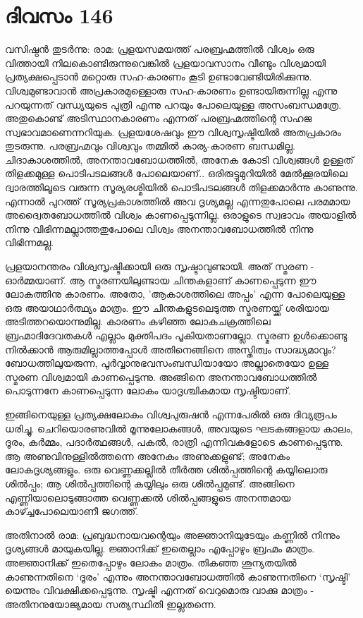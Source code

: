 \section{ദിവസം 146}


വസിഷ്ഠൻ തുടർന്നു: രാമ: പ്രളയസമയത്ത് പരബ്രഹ്മത്തിൽ വിശ്വം ഒരു വിത്തായി നിലകൊണ്ടിരുന്നുവെങ്കിൽ പ്രളയാവസാനം വീണ്ടും വിശ്വമായി പ്രത്യക്ഷപ്പെടാൻ മറ്റൊരു സഹ-കാരണം കൂടി ഉണ്ടാവേണ്ടിയിരിക്കുന്നു. വിശ്വമുണ്ടാവാൻ അപ്രകാരമുള്ളൊരു സഹ-കാരണം ഉണ്ടായിരുന്നില്ല എന്നു പറയുന്നത് വന്ധ്യയുടെ പുത്രി എന്നു പറയും പോലെയുള്ള അസംബന്ധമത്രേ. അതുകൊണ്ട് അടിസ്ഥാനകാരണം എന്നത് പരബ്രഹ്മത്തിന്റെ സഹജ സ്വഭാവമാണെന്നറിയുക. പ്രളയശേഷവും ഈ വിശ്വസൃഷ്ടിയില്‍ അതപ്രകാരം തുടരുന്നു. പരബ്രഹ്മവും വിശ്വവും തമ്മിൽ കാര്യ-കാരണ ബന്ധമില്ല. ചിദാകാശത്തിൽ, അനന്താവബോധത്തിൽ, അനേക കോടി വിശ്വങ്ങൾ ഉള്ളത് തിളക്കമുള്ള പൊടിപടലങ്ങൾ പോലെയാണ്‌.. ഒരിരുട്ടുമുറിയില്‍  മേൽക്കൂരയിലെ ദ്വാരത്തിലൂടെ വരുന്ന സൂര്യരശ്മിയിൽ പൊടിപടലങ്ങൾ തിളക്കമാർന്നു കാണുന്നു. എന്നാൽ പുറത്ത് സൂര്യപ്രകാശത്തിൽ അവ ദൃശ്യമല്ല എന്നതുപോലെ പരമമായ അദ്വൈതബോധത്തിൽ വിശ്വം കാണപ്പെടുന്നില്ല. ഒരാളുടെ സ്വഭാവം അയാളിൽ നിന്നു വിഭിന്നമല്ലാത്തതുപോലെ വിശ്വം അനന്താവബോധത്തിൽ നിന്നു വിഭിന്നമല്ല.

പ്രളയാനന്തരം വിശ്വസൃഷ്ടിക്കായി ഒരു സൃഷ്ടാവുണ്ടായി. അത് സ്മരണ - ഓർമ്മയാണ്‌. ആ സ്മരണയിലുണ്ടായ ചിന്തകളാണ്‌ കാണപ്പെടുന്ന ഈ ലോകത്തിനു കാരണം. അതോ, 'ആകാശത്തിലെ അപ്പം' എന്ന പോലെയുള്ള ഒരു അയാഥാർത്ഥ്യം മാത്രം.  ഈ ചിന്തകളുടലെടുത്ത സ്മരണയ്ക്ക് ശരിയായ അടിത്തറയൊന്നുമില്ല. കാരണം കഴിഞ്ഞ ലോകചക്രത്തിലെ ബ്രഹ്മാദിദേവതകൾ എല്ലാം മുക്തിപദം പൂകിയതാണല്ലോ. സ്മരണ ഉൾക്കൊണ്ടു നിൽക്കാൻ ആരുമില്ലാത്തപ്പോൾ അതിനെങ്ങിനെ അസ്തിത്വം സാദ്ധ്യമാവും? ബോധത്തിലുയരുന്ന, പൂർവ്വാനുഭവസംബന്ധിയായോ അല്ലാതെയോ ഉള്ള സ്മരണ വിശ്വമായി കാണപ്പെടുന്നു. അങ്ങിനെ അനന്താവബോധത്തിൽ പൊടുന്നനേ കാണപ്പെടുന്ന ലോകം യാദൃശ്ചികമായ സൃഷ്ടിയാണ്‌.

ഇങ്ങിനെയുള്ള പ്രത്യക്ഷലോകം വിശ്വപുരുഷൻ എന്നപേരിൽ ഒരു ദിവ്യരൂപം ധരിച്ചു. ചെറിയൊരണുവിൽ മൂന്നുലോകങ്ങള്‍, അവയുടെ ഘടകങ്ങളായ കാലം, ദൂരം, കർമ്മം, പദാർത്ഥങ്ങൾ, പകൽ, രാത്രി എന്നിവകളോടെ കാണപ്പെടുന്നു. ആ അണുവിനുള്ളിൽത്തന്നെ  അനേകം അണുക്കളുണ്ട്; അനേകം ലോകദൃശ്യങ്ങളും. ഒരു വെണ്ണക്കല്ലിൽ തീർത്ത ശിൽപ്പത്തിന്റെ കയ്യിലൊരു ശിൽപ്പം; ആ ശിൽപ്പത്തിന്റെ കയ്യിലും ഒരു ശിൽപ്പമുണ്ട്. അങ്ങിനെ എണ്ണിയാലൊടുങ്ങാത്ത വെണ്ണക്കൽ ശിൽപ്പങ്ങളുടെ അനന്തമായ കാഴ്ച്ചപോലെയാണീ ജഗത്ത്.

അതിനാൽ രാമ: പ്രബുദ്ധനായവന്റെയും അജ്ഞാനിയുടേയും കണ്ണിൽ നിന്നും ദൃശ്യങ്ങൾ മായുകയില്ല. ജ്ഞാനിക്ക് ഇതെല്ലാം എപ്പോഴും ബ്രഹ്മം മാത്രം. അജ്ഞാനിക്ക് ഇതെപ്പോഴും ലോകം മാത്രം. തികഞ്ഞ ശൂന്യതയിൽ കാണുന്നതിനെ ‘ദൂരം’ എന്നും അനന്താവബോധത്തിൽ കാണുന്നതിനെ ‘സൃഷ്ടി’ യെന്നും വിവക്ഷിക്കപ്പെടുന്നു. സൃഷ്ടി എന്നത് വെറുമൊരു വാക്കു മാത്രം - അതിനനുയോജ്യമായ സത്യസ്ഥിതി ഇല്ലതന്നെ. 

